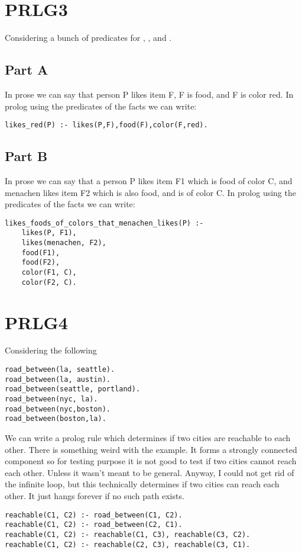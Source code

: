 \section*{PRLG3}
Considering a bunch of predicates for ,
, and .

\subsection*{Part A}
In prose we can say that person P likes item F, F is food, and F is
color red. In prolog using the predicates of the facts we can write:
\begin{verbatim}
likes_red(P) :- likes(P,F),food(F),color(F,red).
\end{verbatim}

\subsection*{Part B}
In prose we can say that a person P likes item F1 which is food of color
C, and menachen likes item F2 which is also food, and is of color C. In
prolog using the predicates of the facts we can write:
\begin{verbatim}
likes_foods_of_colors_that_menachen_likes(P) :-
    likes(P, F1),
    likes(menachen, F2),
    food(F1),
    food(F2),
    color(F1, C),
    color(F2, C).
\end{verbatim}

\section*{PRLG4}
Considering the following
\begin{verbatim}
road_between(la, seattle).
road_between(la, austin).
road_between(seattle, portland).
road_between(nyc, la).
road_between(nyc,boston).
road_between(boston,la).
\end{verbatim}
\noindent
We can write a prolog rule which determines if two cities are reachable
to each other. There is something weird with the example. It forms a
strongly connected component so for testing purpose it is not good to
test if two cities cannot reach each other. Unless it wasn't meant to be
general. Anyway, I could not get rid of the infinite loop, but this
technically determines if two cities can reach each other. It just hangs
forever if no such path exists.
\begin{verbatim}
reachable(C1, C2) :- road_between(C1, C2).
reachable(C1, C2) :- road_between(C2, C1).
reachable(C1, C2) :- reachable(C1, C3), reachable(C3, C2).
reachable(C1, C2) :- reachable(C2, C3), reachable(C3, C1).
\end{verbatim}

